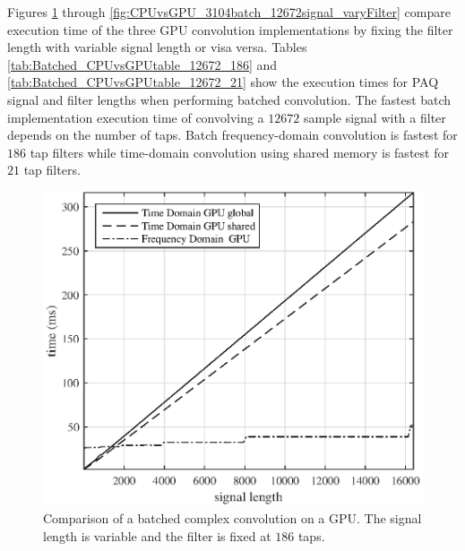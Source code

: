 Figures \ref{fig:CPUvsGPU_3104batch_186taps_varySignal} through \ref{fig:CPUvsGPU_3104batch_12672signal_varyFilter} 
compare execution time of the three GPU convolution implementations by fixing the filter length with variable signal length or visa versa.
Tables \ref{tab:Batched_CPUvsGPUtable_12672_186} and \ref{tab:Batched_CPUvsGPUtable_12672_21} 
show the execution times for PAQ signal and filter lengths when performing batched convolution.
The fastest batch implementation execution time of convolving a $12672$ sample signal with a filter depends on the number of taps.
Batch frequency-domain convolution is fastest for $186$ tap filters while 
time-domain convolution using shared memory is fastest for $21$ tap filters.
\begin{figure}
	\centering\includegraphics[width=5in]{figures/gpu_intro/CPUvsGPU_3104batch_186taps_varySignal.eps}
	\caption{Comparison of a batched complex convolution on a GPU. The signal length is variable and the filter is fixed at $186$ taps.}
	\label{fig:CPUvsGPU_3104batch_186taps_varySignal}
\end{figure}
